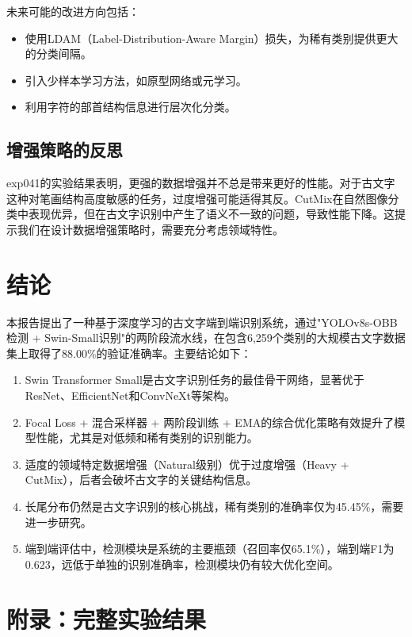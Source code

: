 \documentclass[12pt,a4paper]{article}
\begin{document}
未来可能的改进方向包括：
\begin{itemize}
    \item 使用LDAM（Label-Distribution-Aware Margin）损失，为稀有类别提供更大的分类间隔。
    \item 引入少样本学习方法，如原型网络或元学习。
    \item 利用字符的部首结构信息进行层次化分类。
\end{itemize}

\subsection{增强策略的反思}

exp041的实验结果表明，更强的数据增强并不总是带来更好的性能。对于古文字这种对笔画结构高度敏感的任务，过度增强可能适得其反。CutMix在自然图像分类中表现优异，但在古文字识别中产生了语义不一致的问题，导致性能下降。这提示我们在设计数据增强策略时，需要充分考虑领域特性。

\section{结论}

本报告提出了一种基于深度学习的古文字端到端识别系统，通过"YOLOv8s-OBB检测 + Swin-Small识别"的两阶段流水线，在包含6,259个类别的大规模古文字数据集上取得了88.00\%的验证准确率。主要结论如下：

\begin{enumerate}
    \item Swin Transformer Small是古文字识别任务的最佳骨干网络，显著优于ResNet、EfficientNet和ConvNeXt等架构。
    \item Focal Loss + 混合采样器 + 两阶段训练 + EMA的综合优化策略有效提升了模型性能，尤其是对低频和稀有类别的识别能力。
    \item 适度的领域特定数据增强（Natural级别）优于过度增强（Heavy + CutMix），后者会破坏古文字的关键结构信息。
    \item 长尾分布仍然是古文字识别的核心挑战，稀有类别的准确率仅为45.45\%，需要进一步研究。
    \item 端到端评估中，检测模块是系统的主要瓶颈（召回率仅65.1\%），端到端F1为0.623，远低于单独的识别准确率，检测模块仍有较大优化空间。
\end{enumerate}

\section*{附录：完整实验结果}
\end{document}
